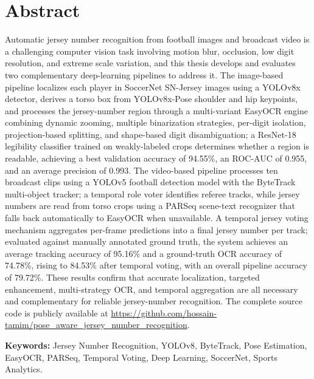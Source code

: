 \chapter*{Abstract}

Automatic jersey number recognition from football images and broadcast
video is a challenging computer vision task involving motion blur,
occlusion, low digit resolution, and extreme scale variation, and this
thesis develops and evaluates two complementary deep-learning pipelines
to address it. The image-based pipeline localizes each player in
SoccerNet SN-Jersey images using a YOLOv8x detector, derives a torso box
from YOLOv8x-Pose shoulder and hip keypoints, and processes the
jersey-number region through a multi-variant EasyOCR engine combining
dynamic zooming, multiple binarization strategies, per-digit isolation,
projection-based splitting, and shape-based digit disambiguation; a
ResNet-18 legibility classifier trained on weakly-labeled crops
determines whether a region is readable, achieving a best validation
accuracy of 94.55\%, an ROC-AUC of 0.955, and an average precision of
0.993. The video-based pipeline processes ten broadcast clips using a
YOLOv5 football detection model with the ByteTrack multi-object
tracker; a temporal role voter identifies referee tracks, while jersey
numbers are read from torso crops using a PARSeq scene-text recognizer
that falls back automatically to EasyOCR when unavailable. A temporal
jersey voting mechanism aggregates per-frame predictions into a final
jersey number per track; evaluated against manually annotated ground
truth, the system achieves an average tracking accuracy of 95.16\% and
a ground-truth OCR accuracy of 74.78\%, rising to 84.53\% after
temporal voting, with an overall pipeline accuracy of 79.72\%. These
results confirm that accurate localization, targeted enhancement,
multi-strategy OCR, and temporal aggregation are all necessary and
complementary for reliable jersey-number recognition. The complete
source code is publicly available at
\url{https://github.com/hossain-tamim/pose_aware_jersey_number_recognition}.

\vspace{0.5cm}
\noindent\textbf{Keywords:} Jersey Number Recognition, YOLOv8, ByteTrack,
Pose Estimation, EasyOCR, PARSeq, Temporal Voting, Deep Learning,
SoccerNet, Sports Analytics.

\clearpage
